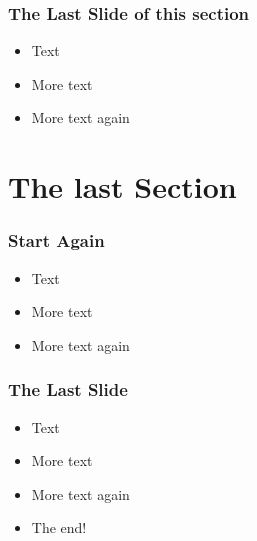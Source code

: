 \begin{frame} 
\frametitle{The Last Slide of this section}
\begin{itemize}[<+->]
 \item Text
 \item More text
 \item More text again
\end{itemize}
\end{frame}

\section{The last Section}
\begin{frame} 
\frametitle{Start Again}
\begin{itemize}[<+->]
 \item Text
 \item More text
 \item More text again
\end{itemize}
\end{frame}

\begin{frame} 
\frametitle{The Last Slide}
\begin{itemize}[<+->]
 \item Text
 \item More text
 \item More text again
 \item The end!
\end{itemize}
\end{frame}


